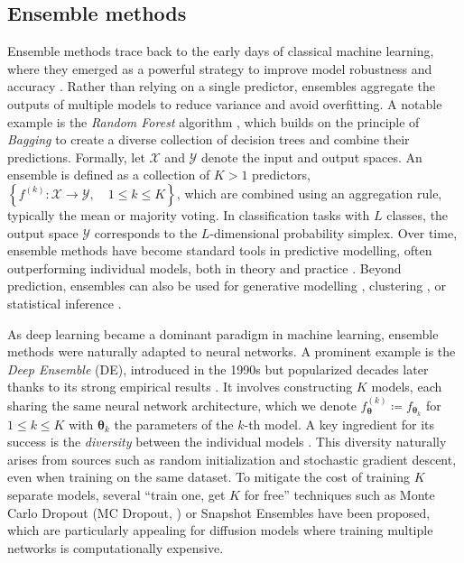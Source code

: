 \documentclass[10pt]{article} %
\newcommand{\engquote}[1]{``#1''}
\def\vtheta{{\bm{\theta}}}
\begin{document}
\subsection{Ensemble methods}

Ensemble methods trace back to the early days of classical machine learning, where they emerged as a powerful strategy to improve model robustness and accuracy \citep{dietterich2000ensemble, yang2023survey}. Rather than relying on a single predictor, ensembles aggregate the outputs of multiple models to reduce variance and avoid overfitting. A notable example is the \emph{Random Forest} algorithm \citep{breiman2001random}, which builds on the principle of \emph{Bagging} \citep{breiman1996bagging} to create a diverse collection of decision trees and combine their predictions. Formally, let $\mathcal{X}$ and $\mathcal{Y}$ denote the input and output spaces. An ensemble is defined as a collection of $K > 1$ predictors,
$\left\{ f^{(k)} : \mathcal{X} \rightarrow \mathcal{Y}, \quad 1 \leq k \leq K \right\}$,
which are combined using an aggregation rule, typically the mean or majority voting. In classification tasks with $L$ classes, the output space $\mathcal{Y}$ corresponds to the $L$-dimensional probability simplex. Over time, ensemble methods have become standard tools in predictive modelling, often outperforming individual models, both in theory \citep{mattei2024ensemblesgettingbettertime} and practice \citep{dietterich2000ensemble,grinsztajn2022tree}. Beyond prediction, ensembles can also be used for generative modelling \citep{riesselman2018deep}, clustering \citep{fleury2025unsupervised}, or statistical inference \citep{bach2008bolasso}.

As deep learning became a dominant paradigm in machine learning, ensemble methods were naturally adapted to neural networks. A prominent example is the \emph{Deep Ensemble} (DE), introduced in the 1990s \citep{hansen1990neural} but popularized decades later thanks to its strong empirical results \citep{lakshminarayanan2017simple, stewart2023regression}. It involves constructing $K$ models, each sharing the same neural network architecture, which we denote $f_{\vtheta}^{(k)} \coloneqq f_{\vtheta_k}$ for $1 \leq k \leq K$ with $\vtheta_k$ the parameters of the $k$-th model. A key ingredient for its success is the \emph{diversity} between the individual models \citep{fort2019deep}. This diversity naturally arises from sources such as random initialization and stochastic gradient descent, even when training on the same dataset. To mitigate the cost of training \(K\) separate models, several \engquote{train one, get \(K\) for free} techniques such as Monte Carlo Dropout (MC Dropout, \citealp{srivastava2014dropout, gal2016dropout}) or  Snapshot Ensembles \citep{huang2017snapshot} have been proposed, which are particularly appealing for diffusion models where training multiple networks is computationally expensive.
\end{document}
